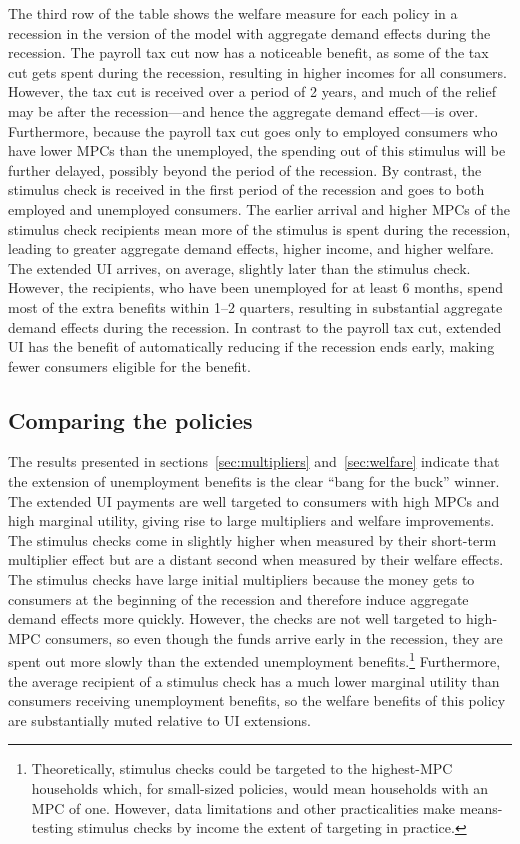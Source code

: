 \documentclass[qe,draft]{econsocart}
\theoremstyle{plain}
\theoremstyle{definition}
\begin{document}
The third row of the table shows the welfare measure for each policy in a recession in the version of the model with aggregate demand effects during the recession.
The payroll tax cut now has a noticeable benefit, as some of the tax cut gets spent during the recession, resulting in higher incomes for all consumers.
However, the tax cut is received over a period of 2 years, and much of the relief may be after the recession---and hence the aggregate demand effect---is over.
Furthermore, because the payroll tax cut goes only to employed consumers who have lower MPCs than the unemployed, the spending out of this stimulus will be further delayed, possibly beyond the period of the recession.
By contrast, the stimulus check is received in the first period of the recession and goes to both employed and unemployed consumers.
The earlier arrival and higher MPCs of the stimulus check recipients mean more of the stimulus is spent during the recession, leading to greater aggregate demand effects, higher income, and higher welfare.
The extended UI arrives, on average, slightly later than the stimulus check.
However, the recipients, who have been unemployed for at least 6 months, spend most of the extra benefits within 1--2 quarters, resulting in substantial aggregate demand effects during the recession.
In contrast to the payroll tax cut, extended UI has the benefit of automatically reducing if the recession ends early, making fewer consumers eligible for the benefit.

\subsection{Comparing the policies}
\label{subsec:comparing-the-policies} %

The results presented in sections~\ref{sec:multipliers} and~\ref{sec:welfare} indicate that the extension of unemployment benefits is the clear ``bang for the buck'' winner.
The extended UI payments are well targeted to consumers with high MPCs and high marginal utility, giving rise to large multipliers and welfare improvements.
The stimulus checks come in slightly higher when measured by their short-term multiplier effect but are a distant second when measured by their welfare effects.
The stimulus checks have large initial multipliers because the money gets to consumers at the beginning of the recession and therefore induce aggregate demand effects more quickly.
However, the checks are not well targeted to high-MPC consumers, so even though the funds arrive early in the recession, they are spent out more slowly than the extended unemployment benefits.\footnote{Theoretically, stimulus checks could be targeted to the highest-MPC households which, for small-sized policies, would mean households with an MPC of one.
  However, data limitations and other practicalities make means-testing stimulus checks by income the extent of targeting in practice.} Furthermore, the average recipient of a stimulus check has a much lower marginal utility than consumers receiving unemployment benefits, so the welfare benefits of this policy are substantially muted relative to UI extensions.
\end{document}
